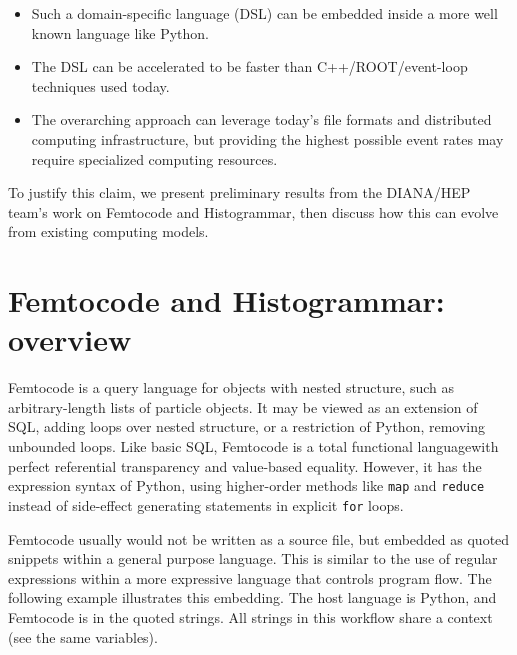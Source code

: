 \documentclass{article}
\begin{document}
\begin{itemize}
\item Such a domain-specific language (DSL) can be embedded inside a more well known language like Python.
\item The DSL can be accelerated to be faster than C++/ROOT/event-loop techniques used today.
\item The overarching approach can leverage today's file formats and distributed computing infrastructure, but providing the highest possible event rates may require specialized computing resources.
\end{itemize}

To justify this claim, we present preliminary results from the DIANA/HEP team's work on Femtocode and Histogrammar, then discuss how this can evolve from existing computing models.

\section{Femtocode and Histogrammar: overview}

Femtocode is a query language for objects with nested structure, such as arbitrary-length lists of particle objects. It may be viewed as an extension of SQL, adding loops over nested structure, or a restriction of Python, removing unbounded loops. Like basic SQL, Femtocode is a total functional language\footnotemark with perfect referential transparency and value-based equality. However, it has the expression syntax of Python, using higher-order methods like {\tt map} and {\tt reduce} instead of side-effect generating statements in explicit {\tt for} loops.


Femtocode usually would not be written as a source file, but embedded as quoted snippets within a general purpose language. This is similar to the use of regular expressions within a more expressive language that controls program flow. The following example illustrates this embedding. The host language is Python, and Femtocode is in the quoted strings. All strings in this workflow share a context (see the same variables).
\end{document}
